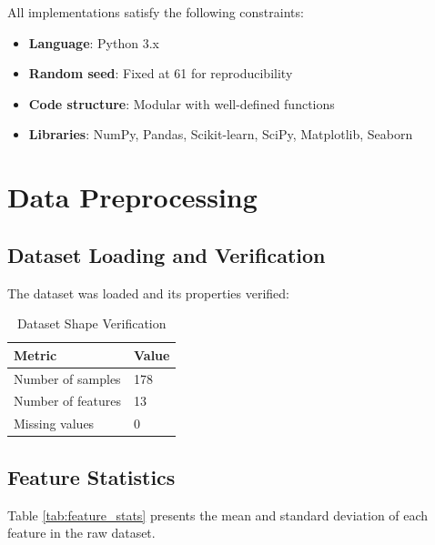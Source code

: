 \documentclass[12pt,a4paper]{article}
\begin{document}
All implementations satisfy the following constraints:
\begin{itemize}
    \item \textbf{Language}: Python 3.x
    \item \textbf{Random seed}: Fixed at 61 for reproducibility
    \item \textbf{Code structure}: Modular with well-defined functions
    \item \textbf{Libraries}: NumPy, Pandas, Scikit-learn, SciPy, Matplotlib, Seaborn
\end{itemize}

\section{Data Preprocessing}

\subsection{Dataset Loading and Verification}

The dataset was loaded and its properties verified:

\begin{table}[H]
\centering
\caption{Dataset Shape Verification}
\begin{tabular}{ll}
\toprule
\textbf{Metric} & \textbf{Value} \\
\midrule
Number of samples & 178 \\
Number of features & 13 \\
Missing values & 0 \\
\bottomrule
\end{tabular}
\end{table}

\subsection{Feature Statistics}

Table \ref{tab:feature_stats} presents the mean and standard deviation of each feature in the raw dataset.
\end{document}
